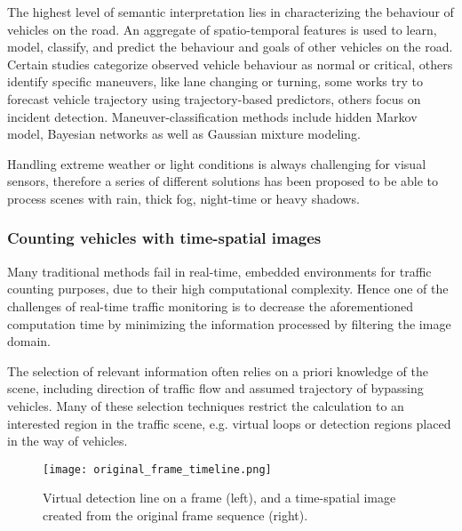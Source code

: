 The highest level of semantic interpretation lies in characterizing the behaviour of vehicles on the road\cite{Sivaraman2013}.
An aggregate of spatio-temporal features is used to learn, model, classify, and predict the behaviour and goals of other vehicles on the road.
Certain studies categorize observed vehicle behaviour as normal or critical\cite{Cherng2009}, others identify specific maneuvers, like lane changing or turning\cite{Garcia2012}, some works try to forecast vehicle trajectory using trajectory-based predictors\cite{Hermes2009}, others focus on incident detection\cite{Kamijo2004}.
Maneuver-classification methods include hidden Markov model\cite{Sivaraman2011}, Bayesian networks\cite{Kasper2012} as well as Gaussian mixture modeling\cite{Wiest2012}.

Handling extreme weather or light conditions is always challenging for visual sensors, therefore a series of different solutions has been proposed to be able to process scenes with rain\cite{Yu2015,Barnum2010}, thick fog\cite{Zhou2014a,Tarel2009}, night-time\cite{Bi2009, Robert2009} or heavy shadows\cite{Kamkar2016, Miller2015}.

\subsubsection{Counting vehicles with time-spatial images}
Many traditional methods fail in real-time, embedded environments for traffic counting purposes, due to their high computational complexity.
Hence one of the challenges of real-time traffic monitoring is to decrease the aforementioned computation time by minimizing the information processed by filtering the image domain.

The selection of relevant information often relies on a priori knowledge of the scene, including direction of traffic flow and assumed trajectory of bypassing vehicles.
Many of these selection techniques restrict the calculation to an interested region in the traffic scene, e.g. virtual loops\cite{Tursun2013a, He2008} or detection regions\cite{Miller2015, Engel2016} placed in the way of vehicles.

\begin{figure}[bh]
	\centering
	\texttt{[image: original\_frame\_timeline.png]}
	\label{fig:TSI}
	\caption{Virtual detection line on a frame (left), and a time-spatial image created from the original frame sequence (right).}
\end{figure}


